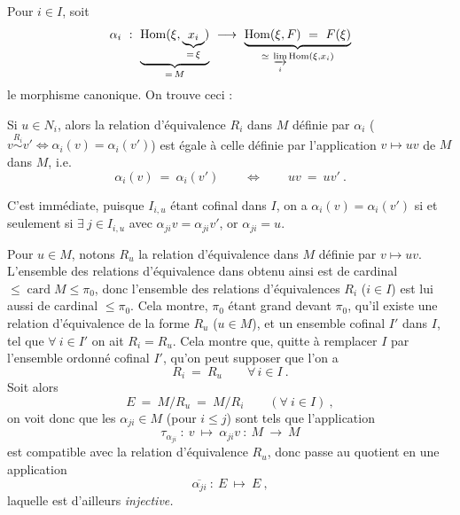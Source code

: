 \documentclass[11pt]{article}
\newcommand{\printedpage}[1]{\marginpar{\footnotesize p.~#1}}
\newcommand{\msp}[1]{\marginpar{\footnotesize [#1]}}
\newcommand{\card}{\operatorname{card}}
\begin{document}
Pour $i \in I$, soit
\[
\alpha_i \ : \ \underbrace{\mathrm{Hom}(\xi, \underbrace{x_i}_{=\,\xi})}_{=\,M} \ \longrightarrow \ \underbrace{\mathrm{Hom}(\xi,F) \ = \ F(\xi)}_{\simeq\ \varinjlim\limits_{i} \mathrm{Hom}(\xi,x_i)}
\]
\printedpage{176}
le morphisme canonique. On trouve ceci :
\begin{center}
%
\begin{minipage}[c]{0.78\linewidth}
Si $u \in N_i$, alors la relation d'équivalence $R_i$ dans $M$ définie par $\alpha_i$ ($v \overset{R_i}{\sim} v' \Longleftrightarrow \alpha_i(v) = \alpha_i(v')$) est égale à celle définie par l'application $v \longmapsto uv$ de $M$ dans $M$, i.e.
\[
\alpha_i(v) \ = \ \alpha_i(v') \qquad \Longleftrightarrow \qquad uv \ = \ uv' \ .
\]
\end{minipage}
\end{center}

C'est immédiate, puisque $I_{i,u}$ étant cofinal dans $I$, on a $\alpha_i(v) = \alpha_i(v')$ si et seulement si $\exists\ j \in I_{i,u}$ avec $\alpha_{ji}v = \alpha_{ji}v'$, or $\alpha_{ji} = u$. %

Pour $u \in M$, notons $R_u$ la relation d'équivalence dans $M$ définie par $v \longmapsto uv$. L'ensemble des relations d'équivalence dans
\msp{page 455}
obtenu ainsi est de cardinal $\leqslant \card M \leqslant \pi_0$, donc l'ensemble des relations d'équivalences $R_i$ ($i \in I$) est lui aussi de cardinal $\leqslant \pi_0$. Cela montre, $\pi_0$ étant grand devant $\pi_0$, qu'il existe une relation d'équivalence de la forme $R_u$ ($u \in M$), et un ensemble cofinal $I'$ dans $I$, tel que $\forall\ i \in I'$ on ait $R_i = R_u$. Cela montre que, quitte à remplacer $I$ par l'ensemble ordonné cofinal $I'$, qu'on peut supposer que l'on a
\[
R_i \ = \ R_u \qquad \forall\, i \in I \ .
\tag*{(4.15.8.5)}
\]
Soit alors
\[
E \ = \ M/R_u \ = \ M/R_i \qquad (\forall\ i \in I) \ ,
\]
on voit donc que les $\alpha_{ji} \in M$ (pour $i \leqslant j$) sont tels que l'application
\[
\tau_{\alpha_{ji}} \ : \ v \ \longmapsto \ \alpha_{ji}v \ : \ M \ \longrightarrow \ M
\]
est compatible avec la relation d'équivalence $R_u$, donc passe au quotient en une application
\[
\overline{\alpha_{ji}} \ : \ E \ \longmapsto \ E \ ,
\]
laquelle est d'ailleurs \textit{injective.}
\end{document}
